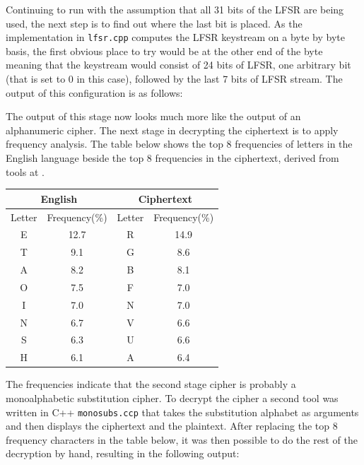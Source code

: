 \documentclass[pdflatex, a4paper,12pt]{article}
\begin{document}
Continuing to run with the assumption that all 31 bits of the LFSR are being
used, the next step is to find out where the last bit is placed. As the
implementation in \verb+lfsr.cpp+ computes the LFSR keystream on a byte by byte
basis, the first obvious place to try would be at the other end of the byte
meaning that the keystream would consist of 24 bits of LFSR, one arbitrary bit
(that is set to 0 in this case), followed by the last 7 bits of LFSR stream. The
output of this configuration is as follows:

\begin{quote}

\end{quote}

The output of this stage now looks much more like the output of an alphanumeric
cipher. The next stage in decrypting the ciphertext is to apply frequency
analysis. The table below shows the top 8 frequencies of letters in the English
language beside the top 8 frequencies in the ciphertext, derived from tools at
\cite{_monoalphabetic_????}.
\begin{center}
\begin{tabular}{cc|cc}
    \multicolumn{2}{c|}{English} & \multicolumn{2}{c}{Ciphertext} \\
    \hline
    Letter & Frequency(\%) & Letter & Frequency(\%) \\
    \hline
    E                & 12.7         & R      & 14.9  \\
    T                & 9.1          & G      & 8.6   \\
    A                & 8.2          & B      & 8.1   \\
    O                & 7.5          & F      & 7.0   \\
    I                & 7.0          & N      & 7.0   \\
    N                & 6.7          & V      & 6.6   \\
    S                & 6.3          & U      & 6.6   \\
    H                & 6.1          & A      & 6.4   \\
\end{tabular}
\end{center}

The frequencies indicate that the second stage cipher is probably a
monoalphabetic substitution cipher. To decrypt the cipher a second tool was
written in C++ \verb+monosubs.ccp+ that takes the substitution alphabet as
arguments and then displays the ciphertext and the plaintext. After replacing
the top 8 frequency characters in the table below, it was then possible to do the
rest of the decryption by hand, resulting in the following output:
\end{document}
